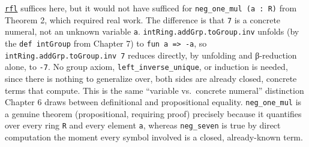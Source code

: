 \href{https://lean-lang.org/doc/reference/latest/Tactic-Proofs/Tactic-Reference/}{\texttt{rfl}} suffices here, but it would not have sufficed for \texttt{neg\_\allowbreak{}one\_\allowbreak{}mul (a : R)} from Theorem 2, which required real work. The difference is that \texttt{7} is a concrete numeral, not an unknown variable \texttt{a}. \texttt{intRing.addGrp.toGroup.inv} unfolds (by the \texttt{def intGroup} from Chapter 7) to \texttt{fun a => -\allowbreak{}a}, so \texttt{intRing.addGrp.toGroup.inv 7} reduces directly, by unfolding and β-reduction alone, to \texttt{-\allowbreak{}7}. No group axiom, \texttt{left\_\allowbreak{}inverse\_\allowbreak{}unique}, or induction is needed, since there is nothing to generalize over, both sides are already closed, concrete terms that compute. This is the same ``variable vs.~concrete numeral'' distinction Chapter 6 draws between definitional and propositional equality. \texttt{neg\_\allowbreak{}one\_\allowbreak{}mul} is a genuine theorem (propositional, requiring proof) precisely because it quantifies over every ring \texttt{R} and every element \texttt{a}, whereas \texttt{neg\_\allowbreak{}seven} is true by direct computation the moment every symbol involved is a closed, already-known term.
